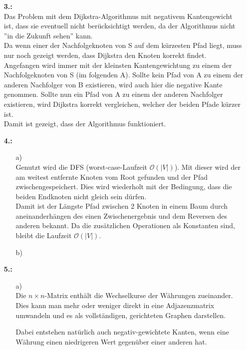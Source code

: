 \documentclass[a4paper,11pt,fleqn]{scrartcl}
\begin{document}
\begin{enumerate}
		\item[\textbf{3.:}] \quad \\
			Das Problem mit dem Dijkstra-Algorithmus mit negativem Kantengewicht ist, dass sie eventuell nicht
			berücksichtigt werden, da der Algorithmus nicht ''in die Zukunft sehen'' kann. \\
			Da wenn einer der Nachfolgeknoten von S auf dem kürzesten Pfad liegt, muss nur noch gezeigt werden, 
			dass Dijkstra den Knoten korrekt findet. \\
			Angefangen wird immer mit der kleinsten Kantengewichtung zu einem der Nachfolgeknoten von S (im 
			folgenden A). Sollte kein Pfad von A zu einem der anderen Nachfolger von B existieren, wird auch hier
			die negative Kante genommen. Sollte nun ein Pfad von A zu einem der anderen Nachfolger existieren, 
			wird Dijkstra korrekt vergleichen, welcher der beiden Pfade kürzer ist. \\
			Damit ist gezeigt, dass der Algorithmus funktioniert.
		\item[\textbf{4.:}]
		\begin{enumerate}
			\item[a)] \quad \\
				Genutzt wird die DFS (worst-case-Laufzeit \(\mathcal{O}(|V|)\)). Mit dieser wird der am weitest 
				entfernte Knoten vom Root gefunden und der Pfad zwischengespeichert. Dies wird wiederholt mit der 
				Bedingung, dass die beiden Endknoten nicht gleich sein dürfen. \\
				Damit ist der Längste Pfad zwischen 2 Knoten in einem Baum durch aneinanderhängen des einen 
				Zwischenergebnis und dem Reversen des anderen bekannt. Da die zusätzlichen Operationen 
				als Konstanten sind, bleibt die Laufzeit \(\mathcal{O}(|V|)\). \\
			\item[b)] \quad \\
				\todo
		\end{enumerate}
		\item[\textbf{5.:}]
		\begin{enumerate}
			\item[a)] \quad \\
			    Die $n \times n$-Matrix enthält die Wechselkurse der Währungen zueinander. Dies kann man mehr oder weniger direkt in eine Adjazenzmatrix umwandeln und es als vollständigen, gerichteten Graphen darstellen.
			    
			    Dabei entstehen natürlich auch negativ-gewichtete Kanten, wenn eine Währung einen niedrigeren Wert gegenüber einer anderen hat.
			    

\end{enumerate}
\end{enumerate}
\end{document}
